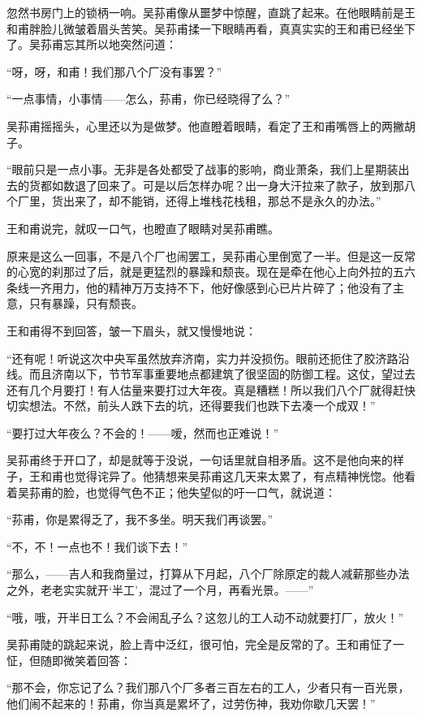 \par 忽然书房门上的锁柄一响。吴荪甫像从噩梦中惊醒，直跳了起来。在他眼睛前是王和甫胖脸儿微皱着眉头苦笑。吴荪甫揉一下眼睛再看，真真实实的王和甫已经坐下了。吴荪甫忘其所以地突然问道：
\par “呀，呀，和甫！我们那八个厂没有事罢？”
\par “一点事情，小事情——怎么，荪甫，你已经晓得了么？”
\par 吴荪甫摇摇头，心里还以为是做梦。他直瞪着眼睛，看定了王和甫嘴唇上的两撇胡子。
\par “眼前只是一点小事。无非是各处都受了战事的影响，商业萧条，我们上星期装出去的货都如数退了回来了。可是以后怎样办呢？出一身大汗拉来了款子，放到那八个厂里，货出来了，却不能销，还得上堆栈花栈租，那总不是永久的办法。”
\par 王和甫说完，就叹一口气，也瞪直了眼睛对吴荪甫瞧。
\par 原来是这么一回事，不是八个厂也闹罢工，吴荪甫心里倒宽了一半。但是这一反常的心宽的刹那过了后，就是更猛烈的暴躁和颓丧。现在是牵在他心上向外拉的五六条线一齐用力，他的精神万万支持不下，他好像感到心已片片碎了；他没有了主意，只有暴躁，只有颓丧。
\par 王和甫得不到回答，皱一下眉头，就又慢慢地说：
\par “还有呢！听说这次中央军虽然放弃济南，实力并没损伤。眼前还扼住了胶济路沿线。而且济南以下，节节军事重要地点都建筑了很坚固的防御工程。这仗，望过去还有几个月要打！有人估量来要打过大年夜。真是糟糕！所以我们八个厂就得赶快切实想法。不然，前头人跌下去的坑，还得要我们也跌下去凑一个成双！”
\par “要打过大年夜么？不会的！——嗳，然而也正难说！”
\par 吴荪甫终于开口了，却是就等于没说，一句话里就自相矛盾。这不是他向来的样子，王和甫也觉得诧异了。他猜想来吴荪甫这几天来太累了，有点精神恍惚。他看着吴荪甫的脸，也觉得气色不正；他失望似的吁一口气，就说道：
\par “荪甫，你是累得乏了，我不多坐。明天我们再谈罢。”
\par “不，不！一点也不！我们谈下去！”
\par “那么，——吉人和我商量过，打算从下月起，八个厂除原定的裁人减薪那些办法之外，老老实实就开‘半工’，混过了一个月，再看光景。——”
\par “哦，哦，开半日工么？不会闹乱子么？这忽儿的工人动不动就要打厂，放火！”
\par 吴荪甫陡的跳起来说，脸上青中泛红，很可怕，完全是反常的了。王和甫怔了一怔，但随即微笑着回答：
\par “那不会，你忘记了么？我们那八个厂多者三百左右的工人，少者只有一百光景，他们闹不起来的！荪甫，你当真是累坏了，过劳伤神，我劝你歇几天罢！”
